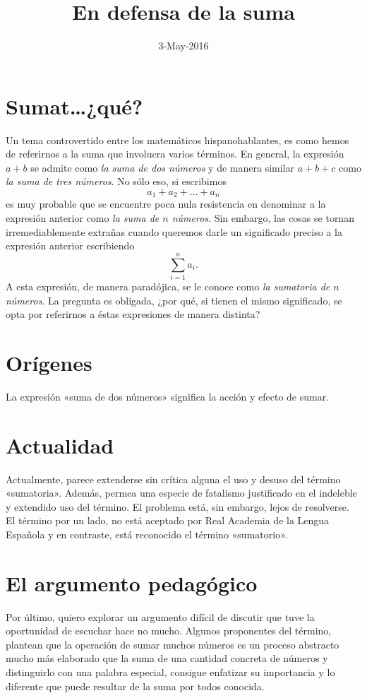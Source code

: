 \documentclass[draft,letter,10pt,notitlepage]{article}
\title{En defensa de la suma}
\date{3-May-2016}
\theoremstyle{definition}
\theoremstyle{remark}
\begin{document}
\maketitle
\section{Sumat\dots ¿qué?}
Un tema controvertido entre los matemáticos hispanohablantes, 
es como hemos de referirnos a la suma que involucra varios términos.
En general, la expresión \( a + b\) se admite como \emph{la suma de dos números}
y de manera similar  \( a + b + c\) como \emph{la suma de tres números}. 
No sólo eso, si escribimos
\[ a_1 + a_2 + \dots + a_n\]
es muy probable que se encuentre poca nula resistencia en
denominar a la expresión anterior como \emph{la suma de \( n\) números}.
Sin embargo, las cosas se tornan irremediablemente extrañas cuando 
queremos darle un significado preciso a la expresión anterior escribiendo
\[ \sum_{i=1}^n a_i.\]
A esta expresión, de manera paradójica, se le conoce como
\emph{la sumatoria de \( n\) números}. La pregunta es obligada, ¿por qué, si
tienen el mismo significado, se opta por referirnos a éstas expresiones de 
manera distinta?

\section{Orígenes}

La expresión «suma de dos números» significa la acción y efecto de sumar.

\section{Actualidad}
Actualmente, parece extenderse sin crítica alguna el uso y desuso del
término «sumatoria». Además, permea una especie de fatalismo justificado
en el indeleble y extendido uso del término. El problema está,
sin embargo, lejos de resolverse. El término por un lado, no está
aceptado por Real Academia de la Lengua Española y en contraste,
está reconocido el término «sumatorio».

\section{El argumento pedagógico}
Por último, quiero explorar un argumento difícil de discutir que tuve
la oportunidad de escuchar hace no mucho. Algunos proponentes del 
término, plantean que la operación de sumar muchos números es un
proceso abstracto mucho más elaborado que la suma de una cantidad
concreta de números y distinguirlo con una palabra
especial, consigue enfatizar su importancia y lo diferente que puede
resultar de la suma por todos conocida.
\end{document}
